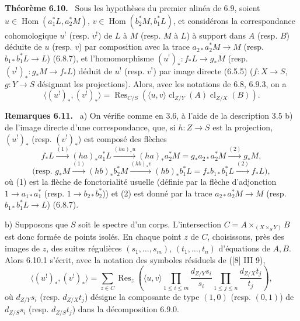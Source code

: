\documentclass[11pt]{article}
\newenvironment{statement}[1]{\par\medskip\noindent\textbf{#1.}\ }{\par\medskip}
\DeclareMathOperator{\Hom}{Hom}
\providecommand{\cl}{\operatorname{cl}}
\providecommand{\Hom}{\operatorname{Hom}}
\providecommand{\cl}{\operatorname{cl}}
\providecommand{\Hom}{\operatorname{Hom}}
\providecommand{\cl}{\operatorname{cl}}
\begin{document}
\begin{statement}{Théorème 6.10}
Sous les hypothèses du premier alinéa de 6.9, soient $u\in\Hom(a_1^*L,a_2^*M)$, $v\in\Hom(b_2^*M,b_1^*L)$, et considérons la correspondance cohomologique $u^!$ (resp. $v^!$) de $L$ à $M$ (resp. $M$ à $L$) à support dans $A$ (resp. $B$) déduite de $u$ (resp. $v$) par composition avec la trace $a_{2*}a_2^*M\to M$ (resp. $b_{1*}b_1^*L\to L$) (6.8.7), et l'homomorphisme $(u^!)_*:f_*L\to g_*M$ (resp. $(v^!)_*:g_*M\to f_*L$) déduit de $u^!$ (resp. $v^!$) par image directe (6.5.5) ($f:X\to S$, $g:Y\to S$ désignant les projections). Alors, avec les notations de 6.8, 6.9.3, on a
\begin{equation}
\tag{6.10.1}
\langle (u^!)_*,(v^!)_*\rangle=\operatorname{Res}_{C/S}(\langle u,v\rangle\cl_{Z/Y}(A)\cl_{Z/X}(B)).
\end{equation}
\end{statement}

\begin{statement}{Remarques 6.11}
a) On vérifie comme en 3.6, à l'aide de la description 3.5 b) de l'image directe d'une correspondance, que, si $h:Z\to S$ est la projection, $(u^!)_*$ (resp. $(v^!)_*$) est composé des flèches
\[
f_*L\xrightarrow{(1)}(ha)_*a_1^*L\xrightarrow{(ha)_*u}(ha)_*a_2^*M=g_*a_{2*}a_2^*M\xrightarrow{(2)}g_*M,
\]
\[
\text{(resp. }g_*M\xrightarrow{(1)}(hb)_*b_2^*M\xrightarrow{(hb)_*v}(hb)_*b_1^*L=f_*b_{1*}b_1^*L\xrightarrow{(2)}f_*L\text{)},
\]
où (1) est la flèche de fonctorialité usuelle (définie par la flèche d'adjonction $1\to a_{1*}a_1^*$ (resp. $1\to b_{2*}b_2^*$)) et (2) est donné par la trace $a_{2*}a_2^*M\to M$ (resp. $b_{1*}b_1^*L\to L$) (6.8.7).

b) Supposons que $S$ soit le spectre d'un corps. L'intersection $C=A\times_{(X\times_S Y)}B$ est donc formée de points isolés. En chaque point $z$ de $C$, choisissons, près des images de $z$, des suites régulières $(s_1,\ldots,s_m)$, $(t_1,\ldots,t_n)$ d'équations de $A,B$. Alors 6.10.1 s'écrit, avec la notation des symboles résiduels de ([8] III 9),
\begin{equation}
\tag{6.11.1}
\langle (u^!)_*,(v^!)_*\rangle=
\sum_{z\in C}\operatorname{Res}_z\left(\langle u,v\rangle
\prod_{1\le i\le m}\frac{d_{Z/Y}s_i}{s_i}
\prod_{1\le j\le n}\frac{d_{Z/X}t_j}{t_j}\right),
\end{equation}
où $d_{Z/Y}s_i$ (resp. $d_{Z/X}t_j$) désigne la composante de type $(1,0)$ (resp. $(0,1)$) de $d_{Z/S}s_i$ (resp. $d_{Z/S}t_j$) dans la décomposition 6.9.0.
\end{statement}
\end{document}

